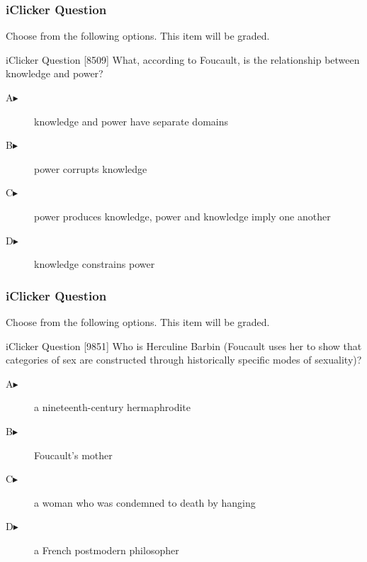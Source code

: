 \documentclass[xcolor=dvipsnames]{beamer}
\begin{document}
\begin{frame}
  \frametitle{iClicker Question}
Choose from the following options. This item will be graded.
\begin{block}{iClicker Question}
[8509] What, according to Foucault, is the relationship between knowledge and power?
\end{block}
\begin{description}
\item[A\hspace{.2in}$\blacktriangleright$] knowledge and power have separate domains
\item[B\hspace{.2in}$\blacktriangleright$] power corrupts knowledge
\item[C\hspace{.2in}$\blacktriangleright$] power produces knowledge, power and knowledge imply one another
\item[D\hspace{.2in}$\blacktriangleright$] knowledge constrains power
\end{description}
\end{frame}


\begin{frame}
  \frametitle{iClicker Question}
Choose from the following options. This item will be graded.
\begin{block}{iClicker Question}
[9851]   Who is Herculine Barbin (Foucault uses her to show that categories
  of sex are constructed through historically specific modes of
  sexuality)?
\end{block}
\begin{description}
\item[A\hspace{.2in}$\blacktriangleright$] a nineteenth-century hermaphrodite
\item[B\hspace{.2in}$\blacktriangleright$] Foucault's mother
\item[C\hspace{.2in}$\blacktriangleright$] a woman who was condemned
  to death by hanging
\item[D\hspace{.2in}$\blacktriangleright$] a French postmodern philosopher
\end{description}
\end{frame}
\end{document}
